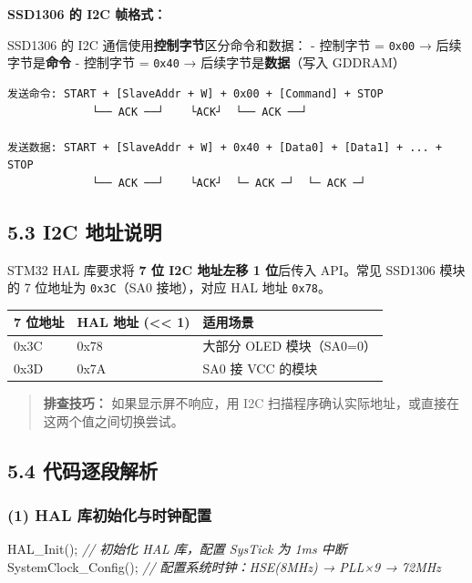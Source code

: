 \documentclass[
  chinese,
  UTF8,
  oneside,
  openany]{ctexbook}
\newenvironment{Shaded}{}{}
\newcommand{\CommentTok}[1]{\textcolor[rgb]{0.38,0.63,0.69}{\textit{#1}}}
\newcommand{\NormalTok}[1]{#1}
\newcommand{\OperatorTok}[1]{\textcolor[rgb]{0.40,0.40,0.40}{#1}}
\begin{document}
\textbf{SSD1306 的 I2C 帧格式：}

SSD1306 的 I2C 通信使用\textbf{控制字节}区分命令和数据： - 控制字节 =
\texttt{0x00} → 后续字节是\textbf{命令} - 控制字节 = \texttt{0x40} →
后续字节是\textbf{数据}（写入 GDDRAM）

\begin{verbatim}
发送命令: START + [SlaveAddr + W] + 0x00 + [Command] + STOP
             └── ACK ──┘    └ACK┘  └── ACK ──┘

发送数据: START + [SlaveAddr + W] + 0x40 + [Data0] + [Data1] + ... + STOP
             └── ACK ──┘    └ACK┘  └─ ACK ─┘  └─ ACK ─┘
\end{verbatim}

\subsection{5.3 I2C 地址说明}\label{i2c-ux5730ux5740ux8bf4ux660e}

STM32 HAL 库要求将 \textbf{7 位 I2C 地址左移 1 位}后传入 API。常见
SSD1306 模块的 7 位地址为 \texttt{0x3C}（SA0 接地），对应 HAL 地址
\texttt{0x78}。

\begin{longtable}[]{@{}lll@{}}
\toprule\noalign{}
7 位地址 & HAL 地址 (\textless\textless{} 1) & 适用场景 \\
\midrule\noalign{}
\endhead
\bottomrule\noalign{}
\endlastfoot
0x3C & 0x78 & 大部分 OLED 模块（SA0=0） \\
0x3D & 0x7A & SA0 接 VCC 的模块 \\
\end{longtable}

\begin{quote}
\textbf{排查技巧：} 如果显示屏不响应，用 I2C
扫描程序确认实际地址，或直接在这两个值之间切换尝试。
\end{quote}

\subsection{5.4
代码逐段解析}\label{ux4ee3ux7801ux9010ux6bb5ux89e3ux6790-2}

\subsubsection{(1) HAL
库初始化与时钟配置}\label{hal-ux5e93ux521dux59cbux5316ux4e0eux65f6ux949fux914dux7f6e-1}

\begin{Shaded}
\begin{Highlighting}[]
\NormalTok{HAL\_Init}\OperatorTok{();}              \CommentTok{// 初始化 HAL 库，配置 SysTick 为 1ms 中断}
\NormalTok{SystemClock\_Config}\OperatorTok{();}    \CommentTok{// 配置系统时钟：HSE(8MHz) → PLL×9 → 72MHz}
\end{Highlighting}
\end{Shaded}
\end{document}
